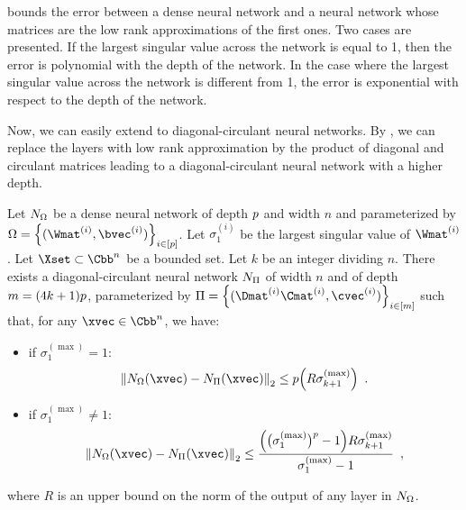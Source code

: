 \noindent
{} bounds the error between a dense neural network and a neural network whose matrices are the low rank approximations of the first ones.
Two cases are presented. If the largest singular value across the network is equal to 1, then the error is polynomial with the depth of the network.
In the case where the largest singular value across the network is different from 1, the error is exponential with respect to the depth of the network.

Now, we can easily extend  to diagonal-circulant neural networks. 
By , we can replace the layers with low rank approximation by the product of diagonal and circulant matrices leading to a diagonal-circulant neural network with a higher depth.



\begin{maincorollary} \label{corollary:relu_to_circ}
  Let $N_\Omega$ be a dense neural network of depth $p$ and width $n$ and parameterized by $\Omega = \left\{(\Wmat^{(i)},\bvec^{(i)} ) \right\}_{i \in [\depth]}$.
  Let $\sigma_1^{(i)}$ be the largest singular value of $\Wmat^{(i)}$.
  Let $\Xset \subset \Cbb^n$ be a bounded set.
  Let $k$ be an integer dividing $n$.
  There  exists a diagonal-circulant neural network $N_\Pi$ of width $n$ and of depth $m = (4k+1)p$, parameterized by $\Pi = \left\{(\Dmat^{(i)}\Cmat^{(i)},\cvec^{(i)})\right\}_{i \in [m]}$ such that, for any $\xvec \in \Cbb^n$, we have:
  \begin{itemize}
    \item if $\sigma_{1}^{(\max)} = 1$:
      \begin{equation}
	\norm{ \nn_\Omega(\xvec) - \nn_{\Pi}(\xvec)}_2 \le \depth \left(  R \sigma_{k+1}^{(\max)} \right) \enspace.
      \end{equation}
    \item if $\sigma_{1}^{(\max)} \neq 1$:
      \begin{equation}
	\norm{ \nn_\Omega(\xvec) - \nn_{\Pi}(\xvec)}_2 \le \frac{\left( \big(\sigma_{1}^{(\max)}\big)^\depth - 1 \right) R \sigma_{k+1}^{(\max)}}{\sigma_{1}^{(\max)} - 1} \enspace,
      \end{equation}
  \end{itemize}
  where $R$ is an upper bound on the norm of the output of any layer in $N_\Omega$.
\end{maincorollary}


